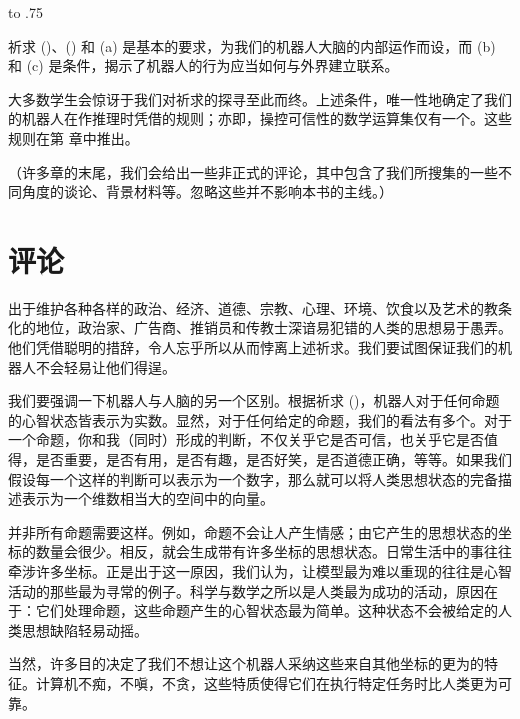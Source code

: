 \placeformula[desiderata-3c]
\startformula
{}\quad\quad\hbox to .75
\stopformula
\stopsubformulas

祈求 ()、() 和 (a) 是基本的要求，为我们的机器人大脑的内部运作而设，而 (b) 和 (c) 是条件，揭示了机器人的行为应当如何与外界建立联系。

大多数学生会惊讶于我们对祈求的探寻至此而终。上述条件，唯一性地确定了我们的机器人在作推理时凭借的规则；亦即，操控可信性的数学运算集仅有一个。这些规则在第  章中推出。

（许多章的末尾，我们会给出一些非正式的评论，其中包含了我们所搜集的一些不同角度的谈论、背景材料等。忽略这些并不影响本书的主线。）

\section{评论}

出于维护各种各样的政治、经济、道德、宗教、心理、环境、饮食以及艺术的教条化的地位，政治家、广告商、推销员和传教士深谙易犯错的人类的思想易于愚弄。他们凭借聪明的措辞，令人忘乎所以从而悖离上述祈求。我们要试图保证我们的机器人不会轻易让他们得逞。

我们要强调一下机器人与人脑的另一个区别。根据祈求 ()，机器人对于任何命题的心智状态皆表示为实数。显然，对于任何给定的命题，我们的看法有多个。对于一个命题，你和我（同时）形成的判断，不仅关乎它是否可信，也关乎它是否值得，是否重要，是否有用，是否有趣，是否好笑，是否道德正确，等等。如果我们假设每一个这样的判断可以表示为一个数字，那么就可以将人类思想状态的完备描述表示为一个维数相当大的空间中的向量。

并非所有命题需要这样。例如，命题不会让人产生情感；由它产生的思想状态的坐标的数量会很少。相反，就会生成带有许多坐标的思想状态。日常生活中的事往往牵涉许多坐标。正是出于这一原因，我们认为，让模型最为难以重现的往往是心智活动的那些最为寻常的例子。科学与数学之所以是人类最为成功的活动，原因在于：它们处理命题，这些命题产生的心智状态最为简单。这种状态不会被给定的人类思想缺陷轻易动摇。

当然，许多目的决定了我们不想让这个机器人采纳这些来自其他坐标的更为的特征。计算机不痴，不嗔，不贪，这些特质使得它们在执行特定任务时比人类更为可靠。

